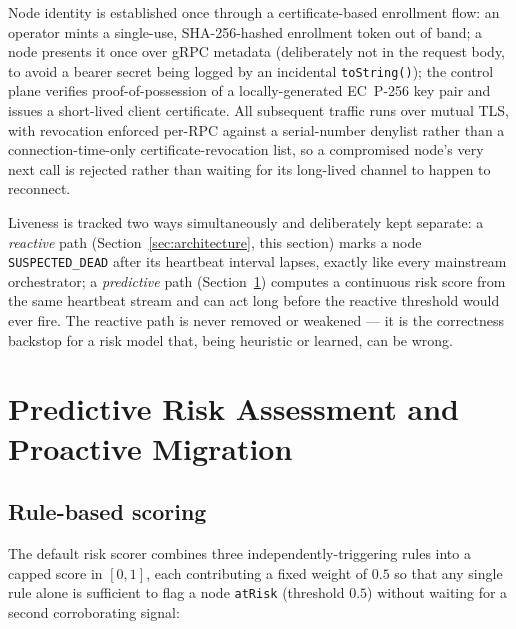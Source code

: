 \documentclass[conference]{IEEEtran}
\begin{document}
Node identity is established once through a certificate-based enrollment flow: an operator mints a
single-use, SHA-256-hashed enrollment token out of band; a node presents it once over gRPC metadata
(deliberately not in the request body, to avoid a bearer secret being logged by an incidental
\texttt{toString()}); the control plane verifies proof-of-possession of a locally-generated EC~P-256
key pair and issues a short-lived client certificate. All subsequent traffic runs over mutual TLS,
with revocation enforced per-RPC against a serial-number denylist rather than a connection-time-only
certificate-revocation list, so a compromised node's very next call is rejected rather than waiting for
its long-lived channel to happen to reconnect.

Liveness is tracked two ways simultaneously and deliberately kept separate: a \emph{reactive} path
(Section~\ref{sec:architecture}, this section) marks a node \texttt{SUSPECTED\_DEAD} after its
heartbeat interval lapses, exactly like every mainstream orchestrator; a \emph{predictive} path
(Section~\ref{sec:risk}) computes a continuous risk score from the same heartbeat stream and can act
long before the reactive threshold would ever fire. The reactive path is never removed or weakened —
it is the correctness backstop for a risk model that, being heuristic or learned, can be wrong.

\section{Predictive Risk Assessment and Proactive Migration}
\label{sec:risk}

\subsection{Rule-based scoring}

The default risk scorer combines three independently-triggering rules into a capped score in
$[0,1]$, each contributing a fixed weight of $0.5$ so that any single rule alone is sufficient to
flag a node \texttt{atRisk} (threshold $0.5$) without waiting for a second corroborating signal:
\end{document}
